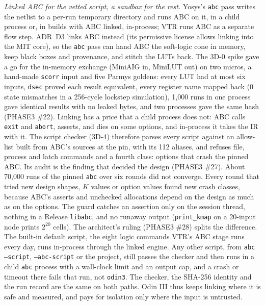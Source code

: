 \documentclass[conference]{IEEEtran}
\newcommand{\code}[1]{\texttt{#1}}
\begin{document}
\emph{Linked ABC for the vetted script, a sandbox for the rest.} Yosys's \code{abc} pass writes
the netlist to a per-run temporary directory and runs ABC on it, in a child process or, in builds
with ABC linked, in-process; VTR runs ABC as a separate flow step. ADR~D3 links ABC instead (its permissive license allows linking into the MIT core),
so the \code{abc} pass can hand ABC the soft-logic cone in memory, keep black boxes and
provenance, and stitch the LUTs back. The 3D-0 spike gave a go for the in-memory exchange
(MiniAIG in, MiniLUT out) on two micros, a hand-made \code{scorr} input and five Parmys goldens:
every LUT had at most six inputs, \code{dsec} proved each result equivalent, every register name
mapped back (0 state mismatches in a 256-cycle lockstep simulation), 1,000 runs in one process
gave identical results with no leaked bytes, and two processes gave the same hash (PHASE3
\#22). Linking has a price that a child process does not: ABC calls \code{exit} and
\code{abort}, asserts, and dies on some options, and in-process it takes the IR with it. The
script checker (3D-4) therefore parses every script against an allow-list built from ABC's
sources at the pin, with its 112 aliases, and refuses file, process and latch commands and a
fourth class: options that crash the pinned ABC. Its audit is the finding that decided the
design (PHASE3 \#27). About 70,000 runs of the pinned \code{abc} over six rounds did not
converge. Every round that tried new design shapes, $K$ values or option values found new crash
classes, because ABC's asserts and unchecked allocations depend on the design as much as on the
options. The guard catches an assertion only on the session thread, nothing in a Release
\code{libabc}, and no runaway output (\code{print\_kmap} on a 20-input node prints $2^{20}$ cells).
The architect's ruling (PHASE3 \#28) splits the difference. The built-in default script, the
eight logic commands VTR's ABC stage runs every day, runs in-process through the linked engine.
Any other script, from \code{abc --script}, \code{--abc-script} or the project, still passes the
checker and then runs in a child \code{abc} process with a wall-clock limit and an output cap,
and a crash or timeout there fails that run, not \code{odin3}. The checker, the SHA-256 identity
and the run record are the same on both paths. Odin III thus keeps linking where it is safe and
measured, and pays for isolation only where the input is untrusted.
\end{document}
